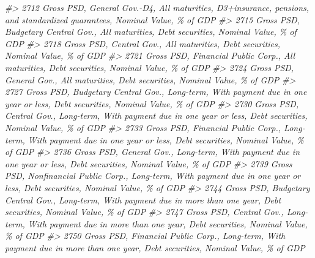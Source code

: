 \documentclass[
]{bxjsbook}
\newenvironment{Shaded}{\begin{snugshade}}{\end{snugshade}}
\newcommand{\CommentTok}[1]{\textcolor[rgb]{0.56,0.35,0.01}{\textit{#1}}}
\theoremstyle{definition}
\theoremstyle{definition}
\theoremstyle{definition}
\theoremstyle{definition}
\theoremstyle{remark}
\begin{document}
\begin{Shaded}
\begin{Highlighting}[]
\CommentTok{\#\textgreater{} 2712                                                   Gross PSD, General Gov.{-}D4, All maturities, D3+insurance, pensions, and standardized guarantees, Nominal Value, \% of GDP}
\CommentTok{\#\textgreater{} 2715                                                                                Gross PSD, Budgetary Central Gov., All maturities, Debt securities, Nominal Value, \% of GDP}
\CommentTok{\#\textgreater{} 2718                                                                                          Gross PSD, Central Gov., All maturities, Debt securities, Nominal Value, \% of GDP}
\CommentTok{\#\textgreater{} 2721                                                                                Gross PSD, Financial Public Corp., All maturities, Debt securities, Nominal Value, \% of GDP}
\CommentTok{\#\textgreater{} 2724                                                                                          Gross PSD, General Gov., All maturities, Debt securities, Nominal Value, \% of GDP}
\CommentTok{\#\textgreater{} 2727                                               Gross PSD, Budgetary Central Gov., Long{-}term, With payment due in one year or less, Debt securities, Nominal Value, \% of GDP}
\CommentTok{\#\textgreater{} 2730                                                         Gross PSD, Central Gov., Long{-}term, With payment due in one year or less, Debt securities, Nominal Value, \% of GDP}
\CommentTok{\#\textgreater{} 2733                                               Gross PSD, Financial Public Corp., Long{-}term, With payment due in one year or less, Debt securities, Nominal Value, \% of GDP}
\CommentTok{\#\textgreater{} 2736                                                         Gross PSD, General Gov., Long{-}term, With payment due in one year or less, Debt securities, Nominal Value, \% of GDP}
\CommentTok{\#\textgreater{} 2739                                            Gross PSD, Nonfinancial Public Corp., Long{-}term, With payment due in one year or less, Debt securities, Nominal Value, \% of GDP}
\CommentTok{\#\textgreater{} 2744                                             Gross PSD, Budgetary Central Gov., Long{-}term, With payment due in more than one year, Debt securities, Nominal Value, \% of GDP}
\CommentTok{\#\textgreater{} 2747                                                       Gross PSD, Central Gov., Long{-}term, With payment due in more than one year, Debt securities, Nominal Value, \% of GDP}
\CommentTok{\#\textgreater{} 2750                                             Gross PSD, Financial Public Corp., Long{-}term, With payment due in more than one year, Debt securities, Nominal Value, \% of GDP}

\end{Highlighting}
\end{Shaded}
\end{document}

